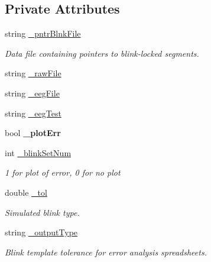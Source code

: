 \subsection*{Private Attributes}
\begin{DoxyCompactItemize}
\item 
string \hyperlink{classBlnkPeakSegAvg_a0dc6865b43997d95a59da56e3be254c8}{\+\_\+pntr\+Blnk\+File}
\begin{DoxyCompactList}\small\item\em Data file containing pointers to blink-\/locked segments. \end{DoxyCompactList}\item 
string \hyperlink{classBlnkPeakSegAvg_a1eee307d94723b3f02f01c98b9df99db}{\+\_\+raw\+File}
\item 
string \hyperlink{classBlnkPeakSegAvg_aa968b86e939b44e6b2585ae5dff022b3}{\+\_\+eeg\+File}
\item 
string \hyperlink{classBlnkPeakSegAvg_a6c00c8592e31ae1b455d280f4cc38f14}{\+\_\+eeg\+Test}
\item 
\mbox{\label{classBlnkPeakSegAvg_ab342080f2ace4e9ab7a89b787741ba54}} 
bool {\bfseries \+\_\+plot\+Err}
\item 
\mbox{\label{classBlnkPeakSegAvg_a5122dfd8d474c1d77b97ae305c5d2e15}} 
int \hyperlink{classBlnkPeakSegAvg_a5122dfd8d474c1d77b97ae305c5d2e15}{\+\_\+blink\+Set\+Num}
\begin{DoxyCompactList}\small\item\em 1 for plot of error, 0 for no plot \end{DoxyCompactList}\item 
\mbox{\label{classBlnkPeakSegAvg_a4aa45238f9bedcdf8eceb76c4631dee4}} 
double \hyperlink{classBlnkPeakSegAvg_a4aa45238f9bedcdf8eceb76c4631dee4}{\+\_\+tol}
\begin{DoxyCompactList}\small\item\em Simulated blink type. \end{DoxyCompactList}\item 
\mbox{\label{classBlnkPeakSegAvg_a34bc3e8c164174d3ddf6f57a273eb700}} 
string \hyperlink{classBlnkPeakSegAvg_a34bc3e8c164174d3ddf6f57a273eb700}{\+\_\+output\+Type}
\begin{DoxyCompactList}\small\item\em Blink template tolerance for error analysis spreadsheets. \end{DoxyCompactList}\end{DoxyCompactItemize}


